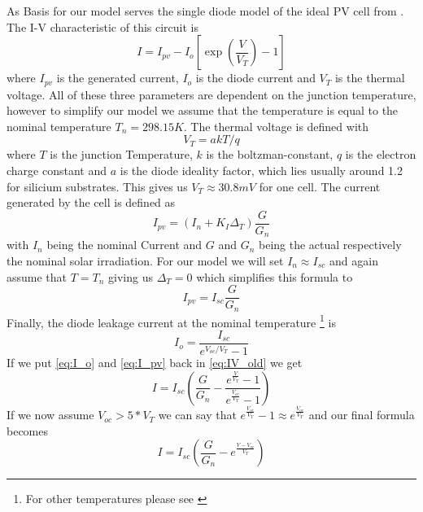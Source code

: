 As Basis for our model serves the single diode model of  the  ideal PV cell from
\cite{ref:villa:pvmodel}  . The I-V characteristic of
this circuit is
\begin{equation} \label{eq:IV_old}
 I = I_{pv} - I_o \left[ \exp \left( \frac{V}{V_T} \right) - 1 \right]
\end{equation}
where $I_{pv}$ is the generated current, $I_o$ is the diode current and $V_T$ is
the thermal voltage. All of these three parameters are dependent on the junction
temperature, however to simplify our model  we  assume  that  the temperature is
equal to the nominal temperature $T_n = 298.15K$. The thermal voltage is defined
with
\begin{equation}
    V_T = a k T / q
\end{equation}   
where $T$ is the junction Temperature,  $k$ is the boltzman-constant, $q$ is the
electron charge constant and $a$  is  the  diode  ideality  factor,  which  lies
usually around 1.2 for silicium substrates. This  gives  us $V_T \approx 30.8mV$
for one cell. The current generated by the cell is defined as
\begin{equation} 
    I_{pv} = \left( I_n + K_I \Delta_T \right) \frac{G}{G_n}
\end{equation} 
with  $I_n$  being  the  nominal  Current  and  $G$  and $G_n$ being the  actual
respectively  the nominal solar irradiation. For our  model  we  will  set  $I_n
\approx I_{sc}$ and again assume that $T  =  T_n$ giving us $\Delta_T = 0$ which
simplifies this formula to
\begin{equation} \label{eq:I_pv}
    I_{pv} = I_{sc} \frac{G}{G_n}
\end{equation} 
Finally, the  diode  leakage  current  at  the nominal temperature \footnote{For
other temperatures please see \cite{ref:villa:pvmodel}} is
\begin{equation} \label{eq:I_o}
    I_o = \frac{I_{sc}}{e^{V_{oc} / V_T} - 1}
\end{equation}
If we put \eqref{eq:I_o} and \eqref{eq:I_pv}  back  in  \eqref{eq:IV_old} we get
\begin{equation}
    I = I_{sc} \left( \frac{G}{G_n} - \frac{e^{\frac{V}{V_T}}-1}{e^{\frac{V_{oc}}{V_T}}-1} \right)
\end{equation}
If we now assume $V_{oc} >  5  *  V_T$ we can say that $e^{\frac{V_{oc}}{V_T}}-1
\approx e^{\frac{V_{oc}}{V_T}}$ and our final formula becomes
\begin{equation} \label{eq:IV}
    I = I_{sc} \left( \frac{G}{G_n} - e^{\frac{V - V_{oc}}{V_T}} \right)
\end{equation}


